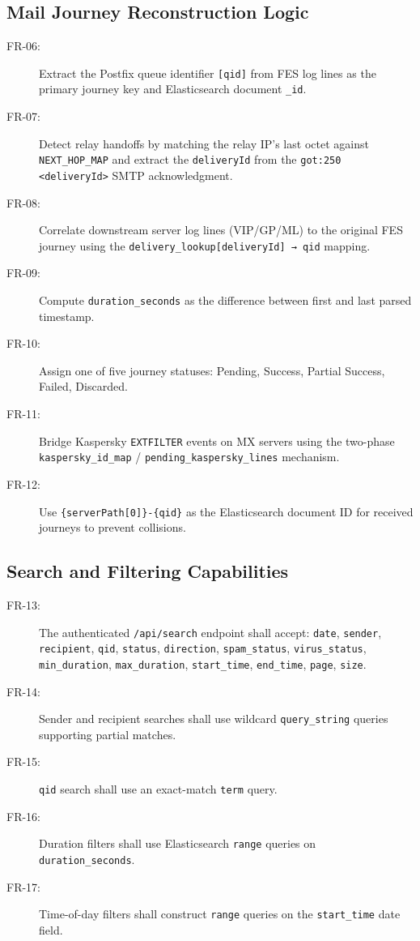 \documentclass[12pt,a4paper,oneside]{report}
\begin{document}
\subsection{Mail Journey Reconstruction Logic}

\begin{description}
  \item[FR-06:] Extract the Postfix queue identifier \texttt{[qid]} from FES log lines as the primary journey key and Elasticsearch document \texttt{\_id}.
  \item[FR-07:] Detect relay handoffs by matching the relay IP's last octet against \texttt{NEXT\_HOP\_MAP} and extract the \texttt{deliveryId} from the \texttt{got:250 <deliveryId>} SMTP acknowledgment.
  \item[FR-08:] Correlate downstream server log lines (VIP/GP/ML) to the original FES journey using the \texttt{delivery\_lookup[deliveryId] → qid} mapping.
  \item[FR-09:] Compute \texttt{duration\_seconds} as the difference between first and last parsed timestamp.
  \item[FR-10:] Assign one of five journey statuses: Pending, Success, Partial Success, Failed, Discarded.
  \item[FR-11:] Bridge Kaspersky \texttt{EXTFILTER} events on MX servers using the two-phase \texttt{kaspersky\_id\_map} / \texttt{pending\_kaspersky\_lines} mechanism.
  \item[FR-12:] Use \texttt{\{serverPath[0]\}-\{qid\}} as the Elasticsearch document ID for received journeys to prevent collisions.
\end{description}

\subsection{Search and Filtering Capabilities}

\begin{description}
  \item[FR-13:] The authenticated \texttt{/api/search} endpoint shall accept: \texttt{date}, \texttt{sender}, \texttt{recipient}, \texttt{qid}, \texttt{status}, \texttt{direction}, \texttt{spam\_status}, \texttt{virus\_status}, \texttt{min\_duration}, \texttt{max\_duration}, \texttt{start\_time}, \texttt{end\_time}, \texttt{page}, \texttt{size}.
  \item[FR-14:] Sender and recipient searches shall use wildcard \texttt{query\_string} queries supporting partial matches.
  \item[FR-15:] \texttt{qid} search shall use an exact-match \texttt{term} query.
  \item[FR-16:] Duration filters shall use Elasticsearch \texttt{range} queries on \texttt{duration\_seconds}.
  \item[FR-17:] Time-of-day filters shall construct \texttt{range} queries on the \texttt{start\_time} date field.
\end{description}
\end{document}
